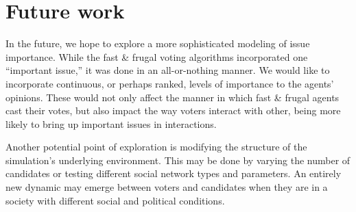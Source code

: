 \section{Future work}
\label{sec:future}








In the future, we hope to explore a more sophisticated modeling of issue
importance. While the fast \& frugal voting algorithms incorporated one
``important issue,'' it was done in an all-or-nothing manner. We would like to
incorporate continuous, or perhaps ranked, levels of importance to the agents'
opinions. These would not only affect the manner in which fast \& frugal agents
cast their votes, but also impact the way voters interact with other, being
more likely to bring up important issues in interactions.

Another potential point of exploration is modifying the structure of the
simulation's underlying environment. This may be done by varying the number of
candidates or testing different social network types and parameters. An
entirely new dynamic may emerge between voters and candidates when they are in
a society with different social and political conditions.
